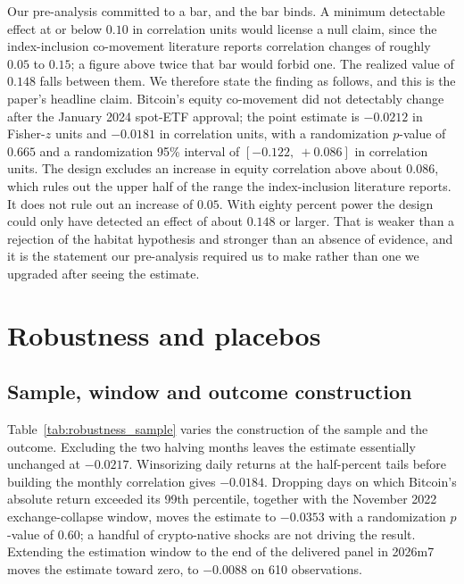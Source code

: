 \documentclass[12pt,a4paper]{article}
\begin{document}
Our pre-analysis committed to a bar, and the bar binds. A minimum detectable effect at or below
$0.10$ in correlation units would license a null claim, since the index-inclusion co-movement literature reports correlation changes of roughly $0.05$ to $0.15$; a figure above twice that bar would forbid one. The realized value of $0.148$ falls between them. We therefore state the finding as follows, and this is the paper's headline claim. Bitcoin's equity co-movement did not detectably change after the January 2024 spot-ETF approval; the point estimate is $-0.0212$ in Fisher-$z$ units and $-0.0181$ in correlation units, with a randomization $p$-value of $0.665$ and a randomization 95\% interval of
$[-0.122,\ +0.086]$ in correlation units. The design excludes an increase in equity correlation above about $0.086$, which rules out the upper half of the range the index-inclusion literature reports. It does not rule out an increase of $0.05$. With eighty percent power the design could only have detected an effect of about $0.148$ or larger. That is weaker than a rejection of the habitat hypothesis and stronger than an absence of evidence, and it is the statement our pre-analysis required us to make rather than one we upgraded after seeing the estimate.

\section{Robustness and placebos}\label{sec:robustness}

\subsection{Sample, window and outcome construction}

Table~\ref{tab:robustness_sample} varies the construction of the sample and the outcome. Excluding the two halving months leaves the estimate essentially unchanged at
$-0.0217$. Winsorizing daily returns at the half-percent tails before building the monthly correlation gives
$-0.0184$. Dropping days on which Bitcoin's absolute return exceeded its 99th percentile, together with the November 2022 exchange-collapse window, moves the estimate to
$-0.0353$ with a randomization $p$-value of
$0.60$; a handful of crypto-native shocks are not driving the result. Extending the estimation window to the end of the delivered panel in 2026m7 moves the estimate toward zero, to
$-0.0088$ on
610 observations.
\end{document}
